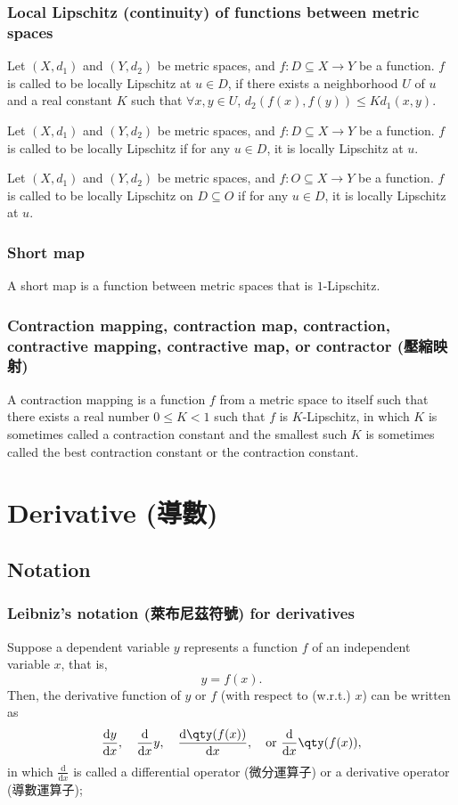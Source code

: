 \documentclass[a4paper,12pt]{report}
\begin{document}
\begin{itemize}
\begin{itemize}
\subsubsection{Local Lipschitz (continuity) of functions between metric spaces}
Let $(X,d_1)$ and $(Y,d_2)$ be metric spaces, and $f\colon D\subseteq X\to Y$ be a function. $f$ is called to be locally Lipschitz at $u\in D$, if there exists a neighborhood $U$ of $u$ and a real constant $K$ such that $\forall x,y\in U$, $d_{2}(f(x),f(y))\leq Kd_{1}(x,y)$.

Let $(X,d_1)$ and $(Y,d_2)$ be metric spaces, and $f\colon D\subseteq X\to Y$ be a function. $f$ is called to be locally Lipschitz if for any $u\in D$, it is locally Lipschitz at $u$.

Let $(X,d_1)$ and $(Y,d_2)$ be metric spaces, and $f\colon O\subseteq X\to Y$ be a function. $f$ is called to be locally Lipschitz on $D\subseteq O$ if for any $u\in D$, it is locally Lipschitz at $u$.
\subsubsection{Short map}
A short map is a function between metric spaces that is $1$-Lipschitz.
\subsubsection{Contraction mapping, contraction map, contraction, contractive mapping, contractive map, or contractor (壓縮映射)}
A contraction mapping is a function $f$ from a metric space to itself such that there exists a real number $0\leq K<1$ such that $f$ is $K$-Lipschitz, in which $K$ is sometimes called a contraction constant and the smallest such $K$ is sometimes called the best contraction constant or the contraction constant.



\section{Derivative (導數)}
\subsection{Notation}
\subsubsection{Leibniz's notation (萊布尼茲符號) for derivatives}
Suppose a dependent variable $y$ represents a function $f$ of an independent variable $x$, that is,
\[y=f(x).\]
Then, the derivative function of $y$ or $f$ (with respect to (w.r.t.) $x$) can be written as
\[\frac{\mathrm{d}y}{\mathrm{d}x},\quad\frac{\mathrm{d}}{\mathrm{d}x}y,\quad\frac{\mathrm{d}\qty(f(x))}{\mathrm{d}x},\quad\text{or\ }\frac{\mathrm{d}}{\mathrm{d}x}\qty(f(x)),\]
in which $\frac{\mathrm{d}}{\mathrm{d}x}$ is called a differential operator (微分運算子) or a derivative operator (導數運算子);


\end{itemize}
\end{itemize}
\end{document}
